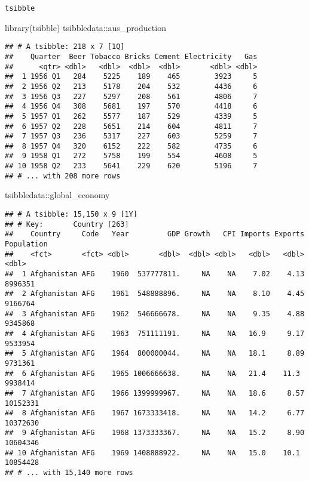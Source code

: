 \documentclass[10pt,xcolor=table,color={dvipsnames,usenames},ignorenonframetext,usepdftitle=false,french]{beamer}
\newenvironment{Shaded}{\begin{snugshade}}{\end{snugshade}}
\newcommand{\FunctionTok}[1]{\textcolor[rgb]{0.00,0.00,0.00}{#1}}
\newcommand{\NormalTok}[1]{#1}
\newcommand{\SpecialCharTok}[1]{\textcolor[rgb]{0.00,0.00,0.00}{#1}}
\begin{document}
\begin{frame}{\texttt{tsibble}}
\protect\hypertarget{tsibble}{}
\begin{Shaded}
\begin{Highlighting}[]
\FunctionTok{library}\NormalTok{(tsibble)}
\NormalTok{tsibbledata}\SpecialCharTok{::}\NormalTok{aus\_production}
\end{Highlighting}
\end{Shaded}

\begin{verbatim}
## # A tsibble: 218 x 7 [1Q]
##    Quarter  Beer Tobacco Bricks Cement Electricity   Gas
##      <qtr> <dbl>   <dbl>  <dbl>  <dbl>       <dbl> <dbl>
##  1 1956 Q1   284    5225    189    465        3923     5
##  2 1956 Q2   213    5178    204    532        4436     6
##  3 1956 Q3   227    5297    208    561        4806     7
##  4 1956 Q4   308    5681    197    570        4418     6
##  5 1957 Q1   262    5577    187    529        4339     5
##  6 1957 Q2   228    5651    214    604        4811     7
##  7 1957 Q3   236    5317    227    603        5259     7
##  8 1957 Q4   320    6152    222    582        4735     6
##  9 1958 Q1   272    5758    199    554        4608     5
## 10 1958 Q2   233    5641    229    620        5196     7
## # ... with 208 more rows
\end{verbatim}

\begin{Shaded}
\begin{Highlighting}[]
\NormalTok{tsibbledata}\SpecialCharTok{::}\NormalTok{global\_economy}
\end{Highlighting}
\end{Shaded}

\begin{verbatim}
## # A tsibble: 15,150 x 9 [1Y]
## # Key:       Country [263]
##    Country     Code   Year         GDP Growth   CPI Imports Exports Population
##    <fct>       <fct> <dbl>       <dbl>  <dbl> <dbl>   <dbl>   <dbl>      <dbl>
##  1 Afghanistan AFG    1960  537777811.     NA    NA    7.02    4.13    8996351
##  2 Afghanistan AFG    1961  548888896.     NA    NA    8.10    4.45    9166764
##  3 Afghanistan AFG    1962  546666678.     NA    NA    9.35    4.88    9345868
##  4 Afghanistan AFG    1963  751111191.     NA    NA   16.9     9.17    9533954
##  5 Afghanistan AFG    1964  800000044.     NA    NA   18.1     8.89    9731361
##  6 Afghanistan AFG    1965 1006666638.     NA    NA   21.4    11.3     9938414
##  7 Afghanistan AFG    1966 1399999967.     NA    NA   18.6     8.57   10152331
##  8 Afghanistan AFG    1967 1673333418.     NA    NA   14.2     6.77   10372630
##  9 Afghanistan AFG    1968 1373333367.     NA    NA   15.2     8.90   10604346
## 10 Afghanistan AFG    1969 1408888922.     NA    NA   15.0    10.1    10854428
## # ... with 15,140 more rows
\end{verbatim}


\end{frame}
\end{document}
